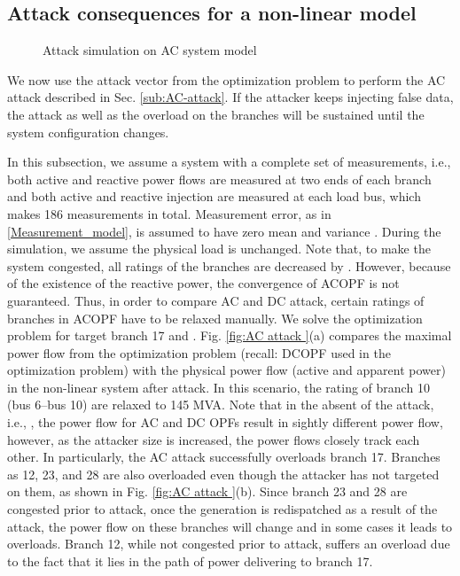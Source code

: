 \documentclass[twocolumn,english,final,journal]{IEEEtran}
\theoremstyle{plain}
\theoremstyle{definition}
\begin{document}
\subsection{Attack consequences for a non-linear model\label{sub:Simulation-of-consequences}}

\begin{figure}[tbh]

\caption{Attack simulation on AC system model\label{fig:AC attack }}
\label{Fig:AC_DC_Compare}
\end{figure}

We now use the attack vector from the optimization problem to perform
the AC attack described in Sec. \ref{sub:AC-attack}. If the attacker
keeps injecting false data, the attack as well as the overload on
the branches will be sustained until the system configuration changes. 

In this subsection, we assume a system with a complete set of measurements,
i.e., both active and reactive power flows are measured at two ends
of each branch and both active and reactive injection are measured
at each load bus, which makes 186 measurements in total. Measurement error, as in \eqref{Measurement_model}, is assumed to have zero mean and variance . During the
simulation, we assume the physical load is unchanged. Note that, to
make the system congested, all ratings of the branches are decreased
by . However, because of the existence of the reactive power,
the convergence of ACOPF is not guaranteed. Thus, in order to compare
AC and DC attack, certain ratings of branches in ACOPF have to be
relaxed manually. We solve the optimization problem for target branch
17 and . Fig. \ref{fig:AC attack }(a) compares the maximal
power flow from the optimization problem (recall: DCOPF used in the
optimization problem) with the physical power flow (active and apparent
power) in the non-linear system after attack. In this scenario, the
rating of branch 10 (bus 6--bus 10) are relaxed to 145 MVA. 
Note that in the absent of the attack, i.e., , the power
flow for AC and DC OPFs result in sightly different power flow, however,
as the attacker size is increased, the power flows closely track each other. In particularly, 
the AC attack successfully overloads branch 17.
Branches as 12, 23, and 28 are also overloaded even though the attacker has  not targeted
on them, as shown in Fig. \ref{fig:AC attack }(b). Since branch 23
and 28 are congested prior to attack, once the generation is redispatched
as a result of the attack, the power flow on these branches will change
and in some cases it leads to overloads. Branch 12, while not congested prior to attack, suffers an overload due to the fact that it lies in the path of  power delivering to branch 17.
\end{document}
